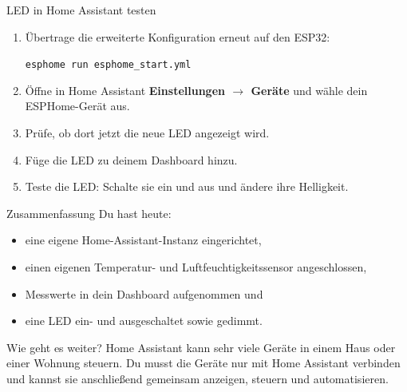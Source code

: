 \documentclass[11pt,aspectratio=169]{beamer}
\begin{document}
\begin{frame}{LED in Home Assistant testen}
  \begin{enumerate}
    \item Übertrage die erweiterte Konfiguration erneut auf den ESP32:
      \begin{center}
        \texttt{esphome run esphome\_start.yml}
      \end{center}
    \item Öffne in Home Assistant \textbf{Einstellungen $\rightarrow$ Geräte}
      und wähle dein ESPHome-Gerät aus.
    \item Prüfe, ob dort jetzt die neue LED angezeigt wird.
    \item Füge die LED zu deinem Dashboard hinzu.
    \item Teste die LED: Schalte sie ein und aus und ändere ihre Helligkeit.
  \end{enumerate}
\end{frame}

\begin{frame}{Zusammenfassung}
  Du hast heute:

  \begin{itemize}
    \item eine eigene Home-Assistant-Instanz eingerichtet,
    \item einen eigenen Temperatur- und Luftfeuchtigkeitssensor angeschlossen,
    \item Messwerte in dein Dashboard aufgenommen und
    \item eine LED ein- und ausgeschaltet sowie gedimmt.
  \end{itemize}

  \vspace{0.8em}

  \begin{block}{Wie geht es weiter?}
    Home Assistant kann sehr viele Geräte in einem Haus oder einer Wohnung
    steuern. Du musst die Geräte nur mit Home Assistant verbinden und kannst
    sie anschließend gemeinsam anzeigen, steuern und automatisieren.
  \end{block}
\end{frame}
\end{document}
